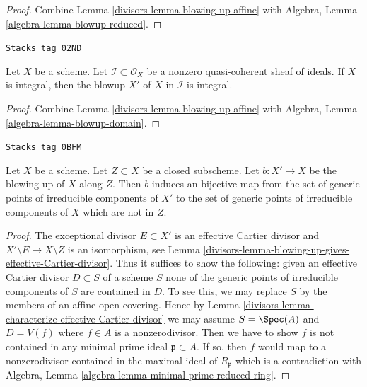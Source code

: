 \begin{proof}

Combine Lemma \ref{divisors-lemma-blowing-up-affine}
with Algebra, Lemma \ref{algebra-lemma-blowup-reduced}.
\end{proof}

\begin{lemma}
\label{divisors-lemma-blow-up-integral-scheme}
\href{https://stacks.math.columbia.edu/tag/02ND}{\texttt{Stacks tag 02ND}}

Let $X$ be a scheme. Let $\mathcal{I} \subset \mathcal{O}_X$ be a
nonzero quasi-coherent sheaf of ideals. If $X$ is integral, then the
blowup $X'$ of $X$ in $\mathcal{I}$ is integral.
\end{lemma}

\begin{proof}

Combine Lemma \ref{divisors-lemma-blowing-up-affine}
with Algebra, Lemma \ref{algebra-lemma-blowup-domain}.
\end{proof}

\begin{lemma}
\label{divisors-lemma-blow-up-and-irreducible-components}
\href{https://stacks.math.columbia.edu/tag/0BFM}{\texttt{Stacks tag 0BFM}}

Let $X$ be a scheme. Let $Z \subset X$ be a closed subscheme.
Let $b : X' \to X$ be the blowing up of $X$ along $Z$. Then
$b$ induces an bijective map from the set of generic points
of irreducible components of $X'$ to the set of generic points of
irreducible components of $X$ which are not in $Z$.
\end{lemma}

\begin{proof}

The exceptional divisor $E \subset X'$ is an effective Cartier divisor
and $X' \setminus E \to X \setminus Z$ is an isomorphism, see
Lemma \ref{divisors-lemma-blowing-up-gives-effective-Cartier-divisor}.
Thus it suffices to show the following: given an effective
Cartier divisor $D \subset S$ of a scheme $S$ none of the
generic points of irreducible components of $S$ are contained in $D$.
To see this, we may replace $S$ by the members of an affine open
covering. Hence by Lemma \ref{divisors-lemma-characterize-effective-Cartier-divisor}
we may assume $S = \Spec(A)$ and $D = V(f)$ where $f \in A$
is a nonzerodivisor. Then we have to show $f$ is not contained
in any minimal prime ideal $\mathfrak p \subset A$.
If so, then $f$ would map to a nonzerodivisor contained
in the maximal ideal of $R_\mathfrak p$ which is a contradiction
with Algebra, Lemma \ref{algebra-lemma-minimal-prime-reduced-ring}.
\end{proof}

